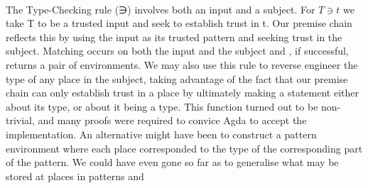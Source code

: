 {\begin{code}
\AgdaSymbol{(}\AgdaSpace{}%
\AgdaSymbol{)}\AgdaSpace{}%
\AgdaSymbol{(}\AgdaSpace{}%
\AgdaSymbol{)}\AgdaSpace{}%
\AgdaSymbol{=}\AgdaSpace{}%
\AgdaSpace{}%
\AgdaSpace{}%
\AgdaSymbol{(}\AgdaSpace{}%
\AgdaSpace{}%
\AgdaSpace{}%
\AgdaSymbol{(}\AgdaSpace{}%
\AgdaSymbol{))}\<%
\\
\>[0]\AgdaSpace{}%
\AgdaSymbol{(}\AgdaSpace{}%
\AgdaSymbol{)}\AgdaSpace{}%
\AgdaSymbol{(}\AgdaSpace{}%
\AgdaSymbol{)}\AgdaSpace{}%
\AgdaSymbol{(}\AgdaSpace{}%
\AgdaSymbol{(}\AgdaSpace{}%
\AgdaOperator{\AgdaInductiveConstructor{,}}\AgdaSpace{}%
\AgdaSymbol{))}\AgdaSpace{}%
\AgdaSymbol{=}\AgdaSpace{}%
\AgdaSpace{}%
\AgdaSpace{}%
\AgdaSymbol{(}\AgdaSpace{}%
\AgdaSpace{}%
\AgdaSpace{}%
\AgdaSymbol{(}\AgdaSpace{}%
\AgdaSymbol{(}\AgdaSpace{}%
\AgdaOperator{\AgdaInductiveConstructor{,}}\AgdaSpace{}%
\AgdaSpace{}%
\AgdaSpace{}%
\AgdaSpace{}%
\AgdaSpace{}%
\AgdaSymbol{(}\AgdaSpace{}%
\AgdaSpace{}%
\AgdaSymbol{)))))}\<%
\end{code}
}
The Type-Checking rule (∋) involves both an input and a subject. For
$T ∋ t$ we take T to be a trusted input and seek to establish trust
in t. Our premise chain reflects this by using the input as its
trusted pattern and seeking trust in the subject. Matching occurs on
both the input and the subject and , if successful, returns a
pair of environments. We may also use this rule to reverse engineer
the type of any place in the subject, taking advantage of the fact that
our premise chain can only establish trust in a place by ultimately making
a statement either about its type, or about it being a type. This function
turned out to be non-trivial, and many proofs were required to convice
Agda to accept the implementation. An alternative might have been to
construct a pattern environment where each place corresponded to the
type of the corresponding part of the pattern. We could have even gone
so far as to generalise what may be stored at places in patterns and
